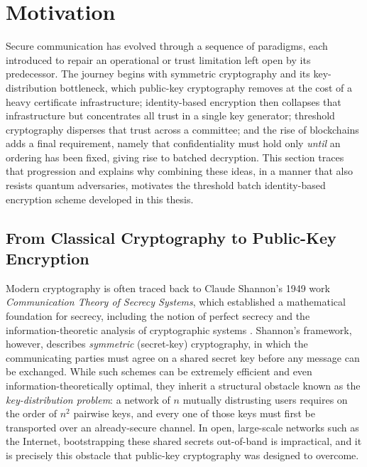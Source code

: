 
% 
\section{Motivation}
\label{section:1.1}

Secure communication has evolved through a sequence of paradigms, each introduced
to repair an operational or trust limitation left open by its predecessor. The
journey begins with symmetric cryptography and its key-distribution bottleneck,
which public-key cryptography removes at the cost of a heavy certificate
infrastructure; identity-based encryption then collapses that infrastructure but
concentrates all trust in a single key generator; threshold cryptography disperses
that trust across a committee; and the rise of blockchains adds a final
requirement, namely that confidentiality must hold only \emph{until} an ordering
has been fixed, giving rise to batched decryption. This section traces that
progression and explains why combining these ideas, in a manner that also resists
quantum adversaries, motivates the threshold batch identity-based encryption scheme
developed in this thesis.


\subsection{From Classical Cryptography to Public-Key Encryption}
\label{subsec:pke}

Modern cryptography is often traced back to Claude Shannon’s 1949 work \emph{Communication Theory of Secrecy Systems}, which established a mathematical foundation for secrecy, including the notion of perfect secrecy and the information-theoretic analysis of cryptographic systems \cite{J:Shannon49}. Shannon’s framework, however, describes \emph{symmetric} (secret-key) cryptography, in which the communicating parties must agree on a shared secret key before any message can be exchanged. While such schemes can be extremely efficient and even information-theoretically optimal, they inherit a structural obstacle known as the \emph{key-distribution problem}: a network of $n$ mutually distrusting users requires on the order of $n^2$ pairwise keys, and every one of those keys must first be transported over an already-secure channel. In open, large-scale networks such as the Internet, bootstrapping these shared secrets out-of-band is impractical, and it is precisely this obstacle that public-key cryptography was designed to overcome.

